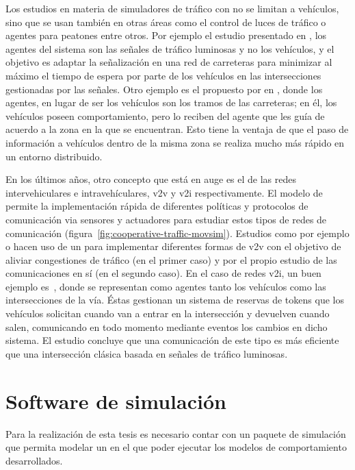 Los estudios en materia de simuladores de tráfico con  no se limitan a vehículos, sino que se usan también en otras áreas como el control de luces de tráfico o agentes para peatones entre otros. Por ejemplo el estudio presentado en \cite{Clymer2002}, los agentes del sistema son las señales de tráfico luminosas y no los vehículos, y el objetivo es adaptar la señalización en una red de carreteras para minimizar al máximo el tiempo de espera por parte de los vehículos en las intersecciones gestionadas por las señales. Otro ejemplo es el propuesto por en \cite{Galis2000}, donde los agentes, en lugar de ser los vehículos son los tramos de las carreteras; en él, los vehículos poseen comportamiento, pero lo reciben del agente que les guía de acuerdo a la zona en la que se encuentran. Esto tiene la ventaja de que el paso de información a vehículos dentro de la misma zona se realiza mucho más rápido en un entorno distribuido.

En los últimos años, otro concepto que está en auge es el de las redes intervehiculares e intravehículares, \gls{v2v} y \gls{v2i} respectivamente. El modelo de  permite la implementación rápida de diferentes políticas y protocolos de comunicación via sensores y actuadores para estudiar estos tipos de redes de comunicación (figura~\ref{fig:cooperative-traffic-movsim}). Estudios como por ejemplo \cite{Shiose2001} o \cite{Galis2000} hacen uso de un  para implementar diferentes formas de \gls{v2v} con el objetivo de aliviar congestiones de tráfico (en el primer caso) y por el propio estudio de las comunicaciones en sí (en el segundo caso). En el caso de redes \gls{v2i}, un buen ejemplo es~\cite{Dresner2004}, donde se representan como agentes tanto los vehículos como las intersecciones de la vía. Éstas gestionan un sistema de reservas de tokens que los vehículos solicitan cuando van a entrar en la intersección y devuelven cuando salen, comunicando en todo momento mediante eventos los cambios en dicho sistema. El estudio concluye que una comunicación de este tipo es más eficiente que una intersección clásica basada en señales de tráfico luminosas.

\section{Software de simulación}

Para la realización de esta tesis es necesario contar con un paquete de simulación que permita modelar un  en el que poder ejecutar los modelos de comportamiento desarrollados.

